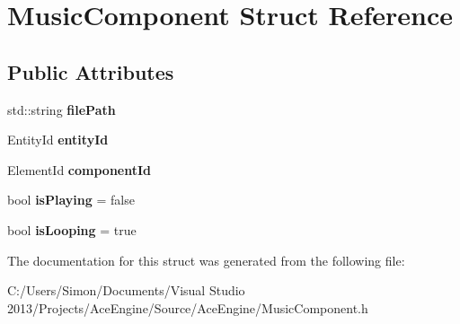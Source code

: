 \hypertarget{struct_music_component}{}\section{Music\+Component Struct Reference}
\label{struct_music_component}
\subsection*{Public Attributes}
\begin{DoxyCompactItemize}
\item 
\hypertarget{struct_music_component_ac6de34253b1d596cb4182b6f2e889123}{}std\+::string {\bfseries file\+Path}\label{struct_music_component_ac6de34253b1d596cb4182b6f2e889123}

\item 
\hypertarget{struct_music_component_a2d77aeaa1b223d31b66f5dc2c5664b19}{}Entity\+Id {\bfseries entity\+Id}\label{struct_music_component_a2d77aeaa1b223d31b66f5dc2c5664b19}

\item 
\hypertarget{struct_music_component_a6b028c0482d92185166d4bf4831bdf65}{}Element\+Id {\bfseries component\+Id}\label{struct_music_component_a6b028c0482d92185166d4bf4831bdf65}

\item 
\hypertarget{struct_music_component_aedb6b53bff9de828367c32cfeffbeab0}{}bool {\bfseries is\+Playing} = false\label{struct_music_component_aedb6b53bff9de828367c32cfeffbeab0}

\item 
\hypertarget{struct_music_component_a9800e5338cb7ebfbb60e40bb346c6823}{}bool {\bfseries is\+Looping} = true\label{struct_music_component_a9800e5338cb7ebfbb60e40bb346c6823}

\end{DoxyCompactItemize}


The documentation for this struct was generated from the following file\+:\begin{DoxyCompactItemize}
\item 
C\+:/\+Users/\+Simon/\+Documents/\+Visual Studio 2013/\+Projects/\+Ace\+Engine/\+Source/\+Ace\+Engine/Music\+Component.\+h\end{DoxyCompactItemize}
